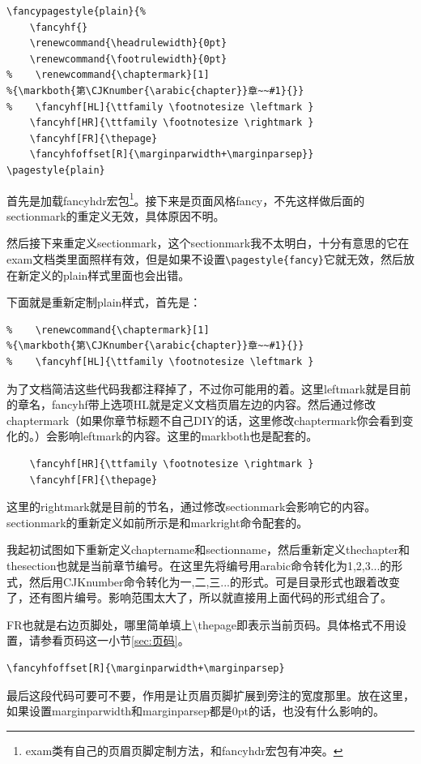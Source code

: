\documentclass[12pt,oneside]{book}
\begin{document}
\begin{common-format}
\begin{Verbatim}
\fancypagestyle{plain}{%
    \fancyhf{}
    \renewcommand{\headrulewidth}{0pt}
    \renewcommand{\footrulewidth}{0pt}
%    \renewcommand{\chaptermark}[1]
%{\markboth{第\CJKnumber{\arabic{chapter}}章~~#1}{}}
%    \fancyhf[HL]{\ttfamily \footnotesize \leftmark }
    \fancyhf[HR]{\ttfamily \footnotesize \rightmark }
    \fancyhf[FR]{\thepage}
    \fancyhfoffset[R]{\marginparwidth+\marginparsep}}
\pagestyle{plain}
\end{Verbatim}

首先是加载fancyhdr宏包\footnote{exam类有自己的页眉页脚定制方法，和fancyhdr宏包有冲突。}。接下来是页面风格fancy，不先这样做后面的sectionmark的重定义无效，具体原因不明。

然后接下来重定义sectionmark，这个sectionmark我不太明白，十分有意思的它在exam文档类里面照样有效，但是如果不设置\verb+\pagestyle{fancy}+它就无效，然后放在新定义的plain样式里面也会出错。

下面就是重新定制plain样式，首先是：
\begin{Verbatim}
%    \renewcommand{\chaptermark}[1]
%{\markboth{第\CJKnumber{\arabic{chapter}}章~~#1}{}}
%    \fancyhf[HL]{\ttfamily \footnotesize \leftmark }
\end{Verbatim}
为了文档简洁这些代码我都注释掉了，不过你可能用的着。这里leftmark就是目前的章名，fancyhf带上选项HL就是定义文档页眉左边的内容。然后通过修改chaptermark（如果你章节标题不自己DIY的话，这里修改chaptermark你会看到变化的。）会影响leftmark的内容。这里的markboth也是配套的。

\begin{Verbatim}
    \fancyhf[HR]{\ttfamily \footnotesize \rightmark }
    \fancyhf[FR]{\thepage}
\end{Verbatim}
这里的rightmark就是目前的节名，通过修改sectionmark会影响它的内容。sectionmark的重新定义如前所示是和markright命令配套的。


我起初试图如下重新定义chaptername和sectionname，然后重新定义thechapter和thesection也就是当前章节编号。在这里先将编号用arabic命令转化为1,2,3...的形式，然后用CJKnumber命令转化为一,二,三...的形式。可是目录形式也跟着改变了，还有图片编号。影响范围太大了，所以就直接用上面代码的形式组合了。


FR也就是右边页脚处，哪里简单填上\textbackslash thepage即表示当前页码。具体格式不用设置，请参看页码这一小节\ref{sec:页码}。

\begin{Verbatim}
\fancyhfoffset[R]{\marginparwidth+\marginparsep}
\end{Verbatim}
最后这段代码可要可不要，作用是让页眉页脚扩展到旁注的宽度那里。放在这里，如果设置marginparwidth和marginparsep都是0pt的话，也没有什么影响的。




\end{common-format}
\end{document}
